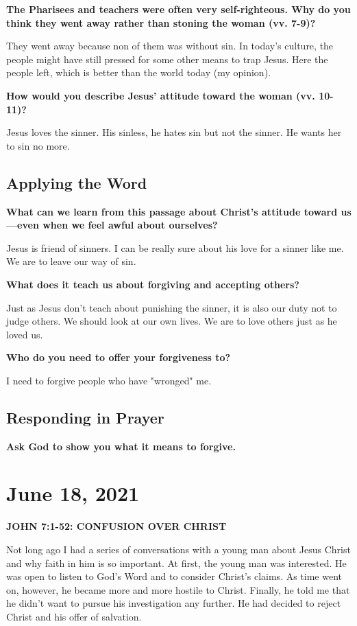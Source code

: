 \documentclass[11pt]{article}
\begin{document}
\textbf{\textbf{The Pharisees and teachers were often very self-righteous. Why do you think they went away rather than stoning the woman (vv. 7-9)?}}

They went away because non of them was without sin. In today's
culture, the people might have still pressed for some other means to
trap Jesus. Here the people left, which is better than the world today
(my opinion).

\textbf{\textbf{How would you describe Jesus' attitude toward the woman (vv. 10-11)?}}

Jesus loves the sinner. His sinless, he hates sin but not the sinner. He wants her to sin no more.

\subsection{Applying the Word}
\label{sec:orgdcecd09}

\textbf{\textbf{What can we learn from this passage about Christ’s attitude toward us—even when we feel awful about ourselves?}}

Jesus is friend of sinners. I can be really sure about his love for a
sinner like me. We are to leave our way of sin.

\textbf{\textbf{What does it teach us about forgiving and accepting others?}}

Just as Jesus don't teach about punishing the sinner, it is also our
duty not to judge others. We should look at our own lives. We are to
love others just as he loved us.

\textbf{\textbf{Who do you need to offer your forgiveness to?}}

I need to forgive people who have "wronged" me.

\subsection{Responding in Prayer}
\label{sec:org3c3ff2b}

\textbf{\textbf{Ask God to show you what it means to forgive.}}
\section{June 18, 2021}
\label{sec:org19eea4b}

\textbf{\textbf{JOHN 7:1-52: CONFUSION OVER CHRIST}}

Not long ago I had a series of conversations with a young man about
Jesus Christ and why faith in him is so important. At first, the
young man was interested. He was open to listen to God’s Word and to
consider Christ’s claims. As time went on, however, he became more
and more hostile to Christ. Finally, he told me that he didn’t want
to pursue his investigation any further. He had decided to reject
Christ and his offer of salvation.
\end{document}
